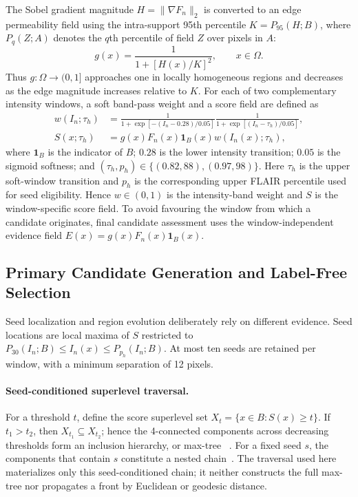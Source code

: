\documentclass[11pt,a4paper]{article}
\begin{document}
The Sobel gradient magnitude $H=\lVert\nabla F_n\rVert_2$ is converted to an edge
permeability field using the intra-support 95th percentile
$K=P_{95}(H;B)$, where $P_q(Z;A)$ denotes the $q$th percentile of field $Z$
over pixels in $A$:
\begin{equation}
 g(x)=\frac{1}{1+[H(x)/K]^2},\qquad x\in\Omega.
\label{eq:gnm}
\end{equation}
Thus $g:\Omega\to(0,1]$ approaches one in locally homogeneous regions and
decreases as the edge magnitude increases relative to $K$.
For each of two complementary intensity windows, a soft band-pass weight and a
score field are defined as
\begin{align}
 w(I_n;\tau_h)&=
 \frac{1}{1+\exp[-(I_n-0.28)/0.05]}
 \frac{1}{1+\exp[(I_n-\tau_h)/0.05]},\\
 S(x;\tau_h)&=g(x)F_n(x)\mathbf 1_B(x)w(I_n(x);\tau_h),
\label{eq:score-primary}
\end{align}
where $\mathbf 1_B$ is the indicator of $B$; $0.28$ is the lower intensity
transition; $0.05$ is the sigmoid softness; and
$(\tau_h,p_h)\in\{(0.82,88),(0.97,98)\}$. Here $\tau_h$ is the upper soft-window
transition and $p_h$ is the corresponding upper FLAIR percentile used for seed
eligibility. Hence $w\in(0,1)$ is the intensity-band weight and $S$ is the
window-specific score field. To avoid favouring the window from
which a candidate originates, final candidate assessment uses the
window-independent evidence field $E(x)=g(x)F_n(x)\mathbf 1_B(x)$.

\subsection{Primary Candidate Generation and Label-Free Selection}\label{sec:candidates}

Seed localization and region evolution deliberately rely on different
evidence. Seed locations are local maxima of $S$ restricted to
$P_{30}(I_n;B)\le I_n(x)\le P_{p_h}(I_n;B)$. At most ten seeds are retained per window,
with a minimum separation of 12 pixels.

\paragraph{Seed-conditioned superlevel traversal.}
For a threshold $t$, define the score superlevel set
$X_t=\{x\in B:S(x)\ge t\}$. If $t_1>t_2$, then
$X_{t_1}\subseteq X_{t_2}$; hence the 4-connected components across decreasing
thresholds form an inclusion hierarchy, or max-tree
~\cite{salembier2009,passat2023}. For a fixed seed $s$, the components that
contain $s$ constitute a nested chain~\cite{passat2011}. The traversal used here
materializes only this seed-conditioned chain; it neither constructs the full
max-tree nor propagates a front by Euclidean or geodesic distance.
\end{document}
